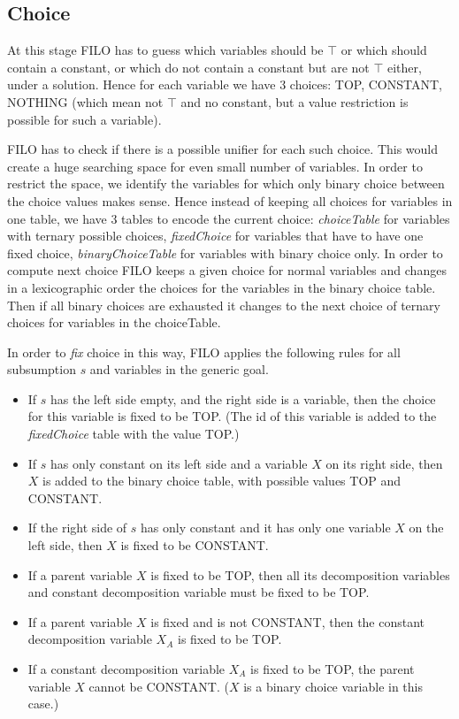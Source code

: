 \documentclass{article}
\begin{document}
\subsection{Choice}
At this stage FILO has to guess which variables should be $\top$ or which should contain
a constant, or which do not contain a constant but are not $\top$ either,  under a solution.
Hence for each variable we have 3 choices: TOP, CONSTANT, NOTHING (which mean not $\top$ and no constant, but a value restriction is possible for such a variable).

FILO has to check if there is a possible unifier for each such choice. This would create a huge searching space
for even small number of variables. 
In order to restrict the space, we identify the variables for which only binary choice between the choice values makes sense.
Hence instead of keeping all choices for variables in one table, we have 3 tables to encode the current choice:
\emph{choiceTable} for variables with ternary possible choices, \emph{fixedChoice} for variables that have to have one fixed choice, \emph{binaryChoiceTable} for variables with binary choice only.
In order to compute next choice FILO keeps a given choice for normal variables and changes in a lexicographic order the choices for the
variables in the binary choice table. Then if all binary choices are exhausted it changes to the next choice
of ternary choices for variables in the choiceTable.

In order to \emph{fix} choice in this way, FILO applies the following rules for all subsumption $s$ and variables in the generic goal.
\begin{itemize}
	\item If $s$ has the left side empty, and the right side is a variable, then the choice for this variable is
	fixed to be TOP. (The id of this variable is added to the \emph{fixedChoice} table with the value TOP.)
	\item If $s$ has only constant on its left side and a variable $X$ on its right side,
	then $X$ is added to the binary choice table, with possible values TOP and CONSTANT.
	\item If the right side of $s$ has only constant and it has only one variable $X$ on the left side,
	then $X$ is fixed to be CONSTANT.
	\item If a parent variable $X$ is fixed to be TOP, then all its decomposition variables and 
	constant decomposition variable must be fixed to be TOP.
	\item If a parent variable $X$ is fixed and is not CONSTANT, then the constant decomposition variable 
	$X_A$ is fixed to be TOP.
	\item If a constant decomposition variable $X_A$ is fixed to be TOP, the parent variable $X$ cannot be CONSTANT. ($X$ is a binary choice variable in this case.)
	
\end{itemize}
\end{document}
